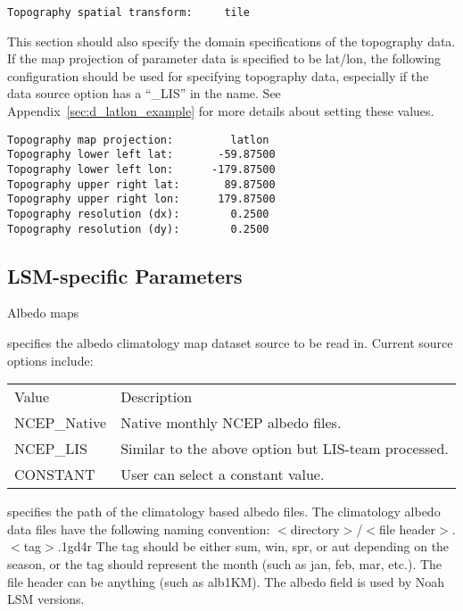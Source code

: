  \begin{Verbatim}[frame=single]
Topography spatial transform:     tile
 \end{Verbatim}

 
 This section should also specify the domain specifications of the
 topography data.
 If the map projection of parameter data is specified to be lat/lon,
 the following configuration should be used for specifying topography
 data, especially if the data source option has a ``\_LIS'' in the name.
 See Appendix~\ref{sec:d_latlon_example} for more details about
 setting these values.
 

 \begin{Verbatim}[frame=single]
Topography map projection:         latlon
Topography lower left lat:       -59.87500
Topography lower left lon:      -179.87500
Topography upper right lat:       89.87500
Topography upper right lon:      179.87500
Topography resolution (dx):        0.2500
Topography resolution (dy):        0.2500
 \end{Verbatim}


 
 \subsection{LSM-specific Parameters} \label{ssec:lsmspecparams}
 


 
 Albedo maps

  specifies the albedo climatology map
 dataset source to be read in. Current source options include:

 \begin{tabular}{ll}
 Value         & Description    \\
 NCEP\_Native  &  Native monthly NCEP albedo files. \\
 NCEP\_LIS     &  Similar to the above option but LIS-team processed. \\
 CONSTANT      &  User can select a constant value. \\
 \end{tabular}

  specifies the path of the climatology based
 albedo files.  The climatology albedo data files have the following
 naming convention: $<$directory$>$/$<$file header$>$.$<$tag$>$.1gd4r
 The tag should be either sum, win, spr, or aut depending on the season,
 or the tag should represent the month (such as jan, feb, mar, etc.).
 The file header can be anything (such as alb1KM).
  The albedo field is used by Noah LSM versions.

